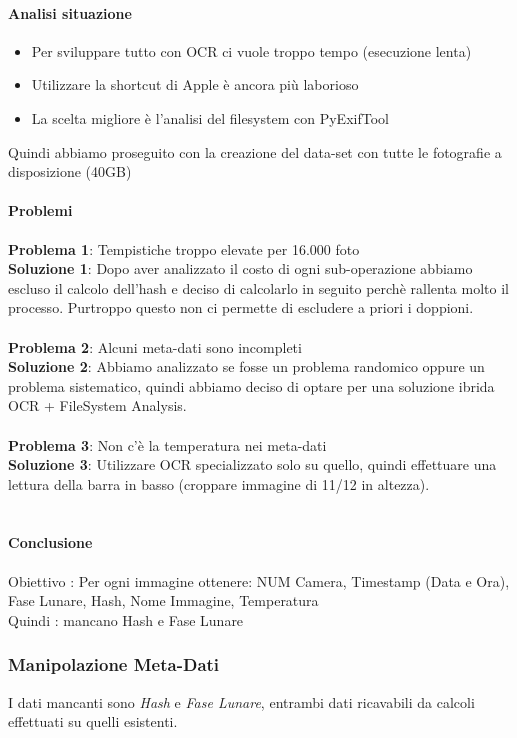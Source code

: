 \documentclass[12pt,a4paper,twoside]{article}
\begin{document}
\paragraph{Analisi situazione}
\begin{itemize}
    \item Per sviluppare tutto con OCR ci vuole troppo tempo (esecuzione lenta)
    \item Utilizzare la shortcut di Apple è ancora più laborioso
    \item La scelta migliore è l'analisi del filesystem con PyExifTool
\end{itemize}
Quindi abbiamo proseguito con la creazione del data-set con tutte le fotografie a disposizione (40GB)

\paragraph{Problemi}
\textbf{Problema 1}: Tempistiche troppo elevate per 16.000 foto\\
\textbf{Soluzione 1}: Dopo aver analizzato il costo di ogni sub-operazione abbiamo escluso il calcolo 
dell'hash e deciso di calcolarlo in seguito perchè rallenta molto il processo. Purtroppo questo non ci 
permette di escludere a priori i doppioni.\\
\\
\textbf{Problema 2}: Alcuni meta-dati sono incompleti\\
\textbf{Soluzione 2}: Abbiamo analizzato se fosse un problema randomico oppure un problema sistematico, 
quindi abbiamo deciso di optare per una soluzione ibrida OCR + FileSystem Analysis.\\
\\
\textbf{Problema 3}: Non c'è la temperatura nei meta-dati\\
\textbf{Soluzione 3}: Utilizzare OCR specializzato solo su quello, quindi effettuare una lettura della 
barra in basso (croppare immagine di 11/12 in altezza).\\
\\

\paragraph{Conclusione}
Obiettivo : Per ogni immagine ottenere: NUM Camera, Timestamp (Data e Ora), Fase Lunare, Hash, Nome
Immagine, Temperatura\\
Quindi : mancano Hash e Fase Lunare

\subsubsection{Manipolazione Meta-Dati}
I dati mancanti sono \textit{Hash} e \textit{Fase Lunare}, entrambi dati ricavabili da calcoli effettuati
su quelli esistenti.\\
\\
\end{document}
